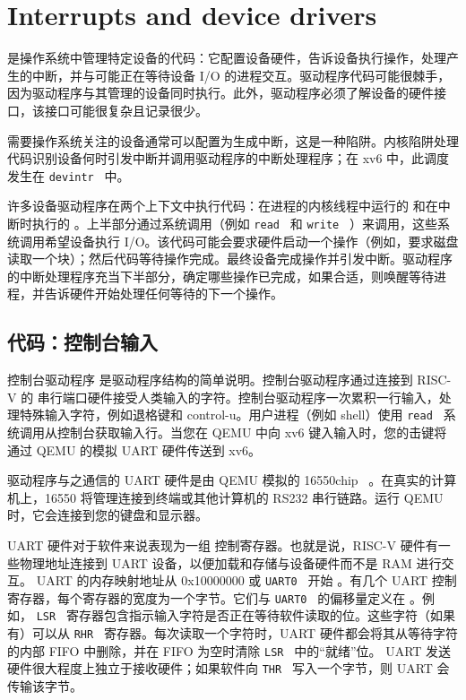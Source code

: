 
   \chapter{Interrupts and device drivers}   
    \label{CH:INTERRUPT}     


        是操作系统中管理特定设备的代码：它配置设备硬件，告诉设备执行操作，处理产生的中断，并与可能正在等待设备 I/O 的进程交互。驱动程序代码可能很棘手，因为驱动程序与其管理的设备同时执行。此外，驱动程序必须了解设备的硬件接口，该接口可能很复杂且记录很少。  

需要操作系统关注的设备通常可以配置为生成中断，这是一种陷阱。内核陷阱处理代码识别设备何时引发中断并调用驱动程序的中断处理程序；在 xv6 中，此调度发生在  {    \tt    devintr   }        中。  

许多设备驱动程序在两个上下文中执行代码：在进程的内核线程中运行的        和在中断时执行的       。上半部分通过系统调用（例如  {    \tt    read   }  和  {    \tt    write   } ）来调用，这些系统调用希望设备执行 I/O。该代码可能会要求硬件启动一个操作（例如，要求磁盘读取一个块）；然后代码等待操作完成。最终设备完成操作并引发中断。驱动程序的中断处理程序充当下半部分，确定哪些操作已完成，如果合适，则唤醒等待进程，并告诉硬件开始处理任何等待的下一个操作。  

   \section{代码：控制台输入  }     

控制台驱动程序        是驱动程序结构的简单说明。控制台驱动程序通过连接到 RISC-V 的        串行端口硬件接受人类输入的字符。控制台驱动程序一次累积一行输入，处理特殊输入字符，例如退格键和 control-u。用户进程（例如 shell）使用  {    \tt    read   }  系统调用从控制台获取输入行。当您在 QEMU 中向 xv6 键入输入时，您的击键将通过 QEMU 的模拟 UART 硬件传送到 xv6。  

驱动程序与之通信的 UART 硬件是由 QEMU 模拟的 16550chip~    \cite{ns16550a}   。在真实的计算机上，16550 将管理连接到终端或其他计算机的 RS232 串行链路。运行 QEMU 时，它会连接到您的键盘和显示器。  

UART 硬件对于软件来说表现为一组        控制寄存器。也就是说，RISC-V 硬件有一些物理地址连接到 UART 设备，以便加载和存储与设备硬件而不是 RAM 进行交互。 UART 的内存映射地址从 0x10000000 或  {    \tt    UART0   }  开始
        。有几个 UART 控制寄存器，每个寄存器的宽度为一个字节。它们与  {    \tt    UART0   }  的偏移量定义在
        。例如，
  {    \tt    LSR   }  寄存器包含指示输入字符是否正在等待软件读取的位。这些字符（如果有）可以从
  {    \tt    RHR   }  寄存器。每次读取一个字符时，UART 硬件都会将其从等待字符的内部 FIFO 中删除，并在 FIFO 为空时清除  {    \tt    LSR   }  中的“就绪”位。 UART 发送硬件很大程度上独立于接收硬件；如果软件向  {    \tt    THR   }  写入一个字节，则 UART 会传输该字节。  

